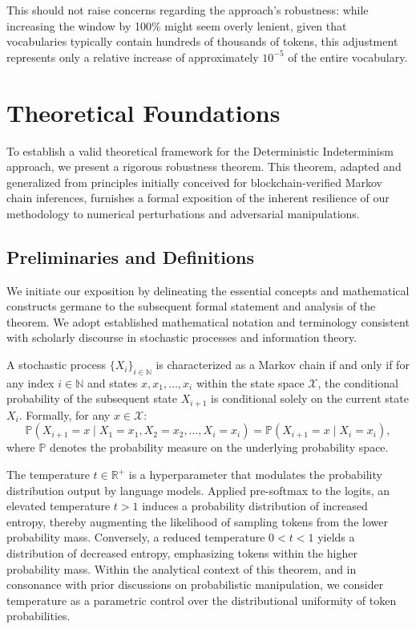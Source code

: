 \documentclass{article}
\begin{document}
This should not raise concerns regarding the approach’s robustness: while increasing the window by 100\% might seem overly lenient, given that vocabularies typically contain hundreds of thousands of tokens, this adjustment represents only a relative increase of approximately $10^{-5}$ of the entire vocabulary.



\section{Theoretical Foundations}

To establish a valid theoretical framework for the Deterministic Indeterminism approach, we present a rigorous robustness theorem. This theorem, adapted and generalized from principles initially conceived for blockchain-verified Markov chain inferences, furnishes a formal exposition of the inherent resilience of our methodology to numerical perturbations and adversarial manipulations.

\subsection{Preliminaries and Definitions}

We initiate our exposition by delineating the essential concepts and mathematical constructs germane to the subsequent formal statement and analysis of the theorem. We adopt established mathematical notation and terminology consistent with scholarly discourse in stochastic processes and information theory.

A stochastic process $\{X_i\}_{i \in \mathbb{N}}$ is characterized as a Markov chain if and only if for any index \(i \in \mathbb{N}\) and states \(x, x_1, \ldots, x_i\) within the state space \(\mathcal{X}\), the conditional probability of the subsequent state \(X_{i+1}\) is conditional solely on the current state \(X_i\). Formally, for any \(x \in \mathcal{X}\):
\[
\mathbb{P}(X_{i+1} = x \mid X_1 = x_1, X_2 = x_2, \dots, X_i = x_i) = \mathbb{P}(X_{i+1} = x \mid X_i = x_i),
\]
where \(\mathbb{P}\) denotes the probability measure on the underlying probability space.

The temperature \(t \in \mathbb{R}^+\) is a hyperparameter that modulates the probability distribution output by language models. Applied pre-softmax to the logits, an elevated temperature \(t > 1\) induces a probability distribution of increased entropy, thereby augmenting the likelihood of sampling tokens from the lower probability mass. Conversely, a reduced temperature \(0 < t < 1\) yields a distribution of decreased entropy, emphasizing tokens within the higher probability mass. Within the analytical context of this theorem, and in consonance with prior discussions on probabilistic manipulation, we consider temperature as a parametric control over the distributional uniformity of token probabilities.
\end{document}
